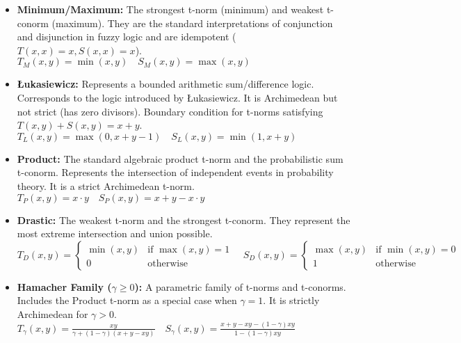 \begin{example}
  \begin{itemize}
    \item \textbf{Minimum/Maximum:} 
    The strongest t-norm (minimum) and weakest t-conorm (maximum). They are the standard interpretations of conjunction and disjunction in fuzzy logic and are idempotent ($T(x,x)=x, S(x,x)=x$).\\
    $T_M(x, y) = \min(x, y) \quad S_M(x, y) = \max(x, y)$

    \item \textbf{Łukasiewicz:}
    Represents a bounded arithmetic sum/difference logic. Corresponds to the logic introduced by Łukasiewicz. It is Archimedean but not strict (has zero divisors). Boundary condition for t-norms satisfying $T(x,y)+S(x,y) = x+y$. \\
    $T_L(x, y) = \max(0, x + y - 1) \quad S_L(x, y) = \min(1, x + y)$

    \item \textbf{Product:}
    The standard algebraic product t-norm and the probabilistic sum t-conorm. Represents the intersection of independent events in probability theory. It is a strict Archimedean t-norm. \\
    $T_P(x, y) = x \cdot y \quad S_P(x, y) = x + y - x \cdot y$

    \item \textbf{Drastic:}
    The weakest t-norm and the strongest t-conorm. They represent the most extreme intersection and union possible.  \\
    $T_D(x, y) = \begin{cases} \min(x,y) & \text{if } \max(x,y)=1 \\ 0 & \text{otherwise} \end{cases} \quad S_D(x, y) = \begin{cases} \max(x,y) & \text{if } \min(x,y)=0 \\ 1 & \text{otherwise} \end{cases}$

    \item \textbf{Hamacher Family ($\gamma \ge 0$):}
    A parametric family of t-norms and t-conorms. Includes the Product t-norm as a special case when $\gamma = 1$. It is strictly Archimedean for $\gamma > 0$. \\
    $T_\gamma(x, y) = \frac{xy}{\gamma + (1-\gamma)(x+y-xy)} \quad S_\gamma(x, y) = \frac{x+y-xy-(1-\gamma)xy}{1-(1-\gamma)xy}$


\end{itemize}
\end{example}
